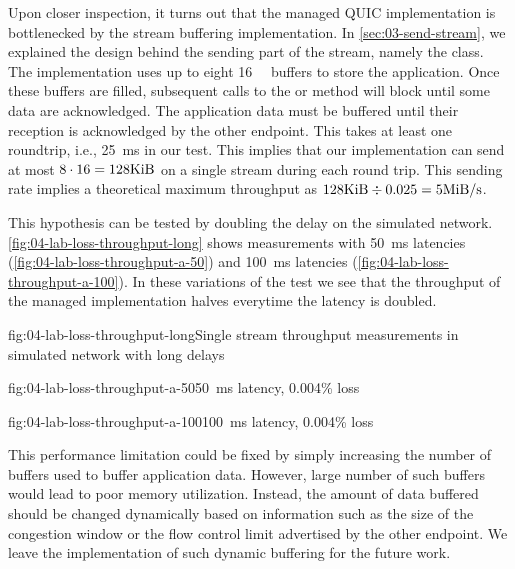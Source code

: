 Upon closer inspection, it turns out that the managed QUIC implementation is bottlenecked by the
stream buffering implementation. In \autoref{sec:03-send-stream}, we explained the design behind the
sending part of the stream, namely the \SendStream{} class. The implementation uses up to eight
\SI{16}{\kibi\byte} buffers to store the application. Once these buffers are filled, subsequent
calls to the  or  method will block until some data are
acknowledged. The application data must be buffered until their reception is acknowledged by the
other endpoint. This takes at least one roundtrip, i.e., \SI{25}{\milli\second} in our test. This
implies that our implementation can send at most $8 \cdot 16 = 128 \si{\kibi\byte}$ on a single stream
during each round trip. This sending rate implies a theoretical maximum throughput as
$128\si{\kibi\byte} \div 0.025 = 5 \si[per-mode=symbol]{\mebi\byte\per\second} $.

This hypothesis can be tested by doubling the delay on the simulated network.
\autoref{fig:04-lab-loss-throughput-long} shows measurements with \SI{50}{\milli\second} latencies
(\autoref{fig:04-lab-loss-throughput-a-50}) and \SI{100}{\milli\second} latencies
(\autoref{fig:04-lab-loss-throughput-a-100}). In these variations of the test we see that the
throughput of the managed implementation halves everytime the latency is doubled.

\begin{myFigure}{fig:04-lab-loss-throughput-long}{Single stream throughput measurements in simulated network with long delays}
\begin{mySubfigure}{0.49\linewidth}{fig:04-lab-loss-throughput-a-50}{\SI{50}{\milli\second} latency, 0.004\% loss}
\footnotesize

\end{mySubfigure}
\begin{mySubfigure}{0.49\linewidth}{fig:04-lab-loss-throughput-a-100}{\SI{100}{\milli\second} latency, 0.004\% loss}
\footnotesize

\end{mySubfigure}
\end{myFigure}

This performance limitation could be fixed by simply increasing the number of buffers used to buffer
application data. However, large number of such buffers would lead to poor memory utilization.
Instead, the amount of data buffered should be changed dynamically based on information such as the
size of the congestion window or the flow control limit advertised by the other endpoint. We leave
the implementation of such dynamic buffering for the future work.

